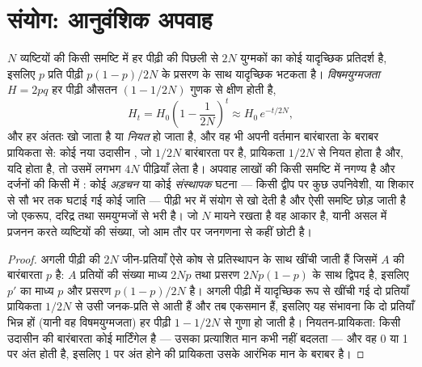 \section{संयोग: आनुवंशिक अपवाह}

\begin{theorem}[आनुवंशिक अपवाह]\label{thm:b2:population-genetics:drift}
$N$  व्यष्टियों की किसी समष्टि में हर पीढ़ी की
 पिछली से $2N$ युग्मकों का कोई यादृच्छिक प्रतिदर्श है,
इसलिए $p$ प्रति पीढ़ी $p(1 - p)/2N$ के प्रसरण के साथ यादृच्छिक भटकता है।
\emph{विषमयुग्मजता} $H = 2pq$ हर पीढ़ी औसतन
$(1 - 1/2N)$ गुणक से क्षीण होती है,
\[
H_t = H_0\left(1 - \frac{1}{2N}\right)^{t} \approx H_0\,e^{-t/2N},
\]
और हर  अंततः खो जाता है या \emph{नियत} हो जाता है, और वह भी
अपनी वर्तमान बारंबारता के बराबर प्रायिकता से: कोई नया उदासीन ,
जो $1/2N$ बारंबारता पर है, प्रायिकता $1/2N$ से नियत होता है और, यदि होता है, तो
उसमें लगभग $4N$ पीढ़ियाँ लेता है। अपवाह लाखों की किसी
समष्टि में नगण्य है और दर्जनों की किसी में : कोई
\emph{अड़चन} या कोई \emph{संस्थापक} घटना --- किसी द्वीप पर कुछ उपनिवेशी, या
शिकार से सौ भर तक घटाई गई कोई जाति --- पीढ़ी भर में संयोग से 
खो देती है और ऐसी समष्टि छोड़ जाती है जो एकरूप,
दरिद्र तथा समयुग्मजों से भरी है। जो $N$ मायने रखता है वह
\emph{} आकार है, यानी असल में प्रजनन करते व्यष्टियों की संख्या,
जो आम तौर पर जनगणना से कहीं छोटी है।
\end{theorem}
\begin{proof}
अगली पीढ़ी की $2N$ जीन-प्रतियाँ ऐसे कोष से प्रतिस्थापन के साथ खींची जाती
हैं जिसमें $A$ की बारंबारता $p$ है: $A$ प्रतियों की संख्या
माध्य $2Np$ तथा प्रसरण $2Np(1 - p)$ के साथ द्विपद है, इसलिए $p'$ का
माध्य $p$ और प्रसरण $p(1 - p)/2N$ है। अगली पीढ़ी में यादृच्छिक रूप से खींची
गई दो प्रतियाँ प्रायिकता $1/2N$ से उसी जनक-प्रति से आती हैं
और तब एकसमान हैं, इसलिए यह संभावना कि दो
प्रतियाँ भिन्न हों (यानी वह विषमयुग्मजता) हर पीढ़ी $1 - 1/2N$ से
गुणा हो जाती है। नियतन-प्रायिकता: किसी उदासीन  की बारंबारता कोई
मार्टिंगेल है --- उसका प्रत्याशित मान कभी नहीं बदलता --- और वह 0
या 1 पर अंत होती है, इसलिए 1 पर अंत होने की प्रायिकता उसके आरंभिक मान के बराबर है।
\end{proof}

